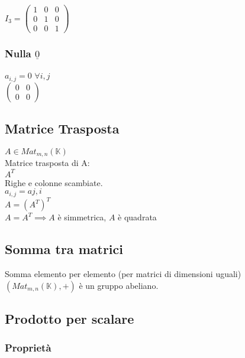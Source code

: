 \documentclass[a4paper, twoside, italian, 11pt]{book}
\newcommand{\K}{\mathbb{K}}
\begin{document}
\noindent
$I_3 = \begin{pmatrix}
1 & 0 & 0 \\
0 & 1 & 0 \\
0 & 0 & 1
\end{pmatrix}$


\subsubsection{Nulla $\underline{0}$}

$a_{i,j} = 0$ $\forall i, j$ \\

\noindent
$\begin{pmatrix}
0 & 0 \\
0 & 0
\end{pmatrix}$


\subsection{Matrice Trasposta}

$A \in Mat_{m,n}(\K)$ \\

\noindent
Matrice trasposta di A: \\
$A^T$ \\

\noindent
Righe e colonne scambiate. \\
$a_{i,j} = a{j,i}$ \\

\noindent
$A = (A^T)^T$ \\

\noindent
$A = A^T \implies A$ è simmetrica, $A$ è quadrata


\subsection{Somma tra matrici}

Somma elemento per elemento (per matrici di dimensioni uguali) \\

\noindent
$(Mat_{m,n}(\K), +)$ è un gruppo abeliano.


\subsection{Prodotto per scalare}


\subsubsection{Proprietà}
\end{document}

